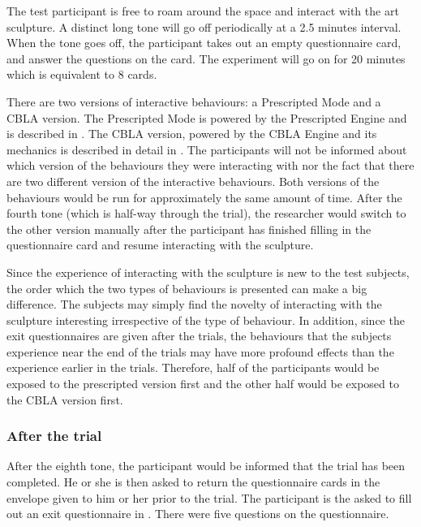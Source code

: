 The test participant is free to roam around the space and interact with the art sculpture. A distinct long tone will go off periodically at a 2.5 minutes interval. When the tone goes off, the participant takes out an empty questionnaire card, and answer the questions on the card. The experiment will go on for 20 minutes which is equivalent to 8 cards.

There are two versions of interactive behaviours: a Prescripted Mode and a CBLA version. The Prescripted Mode is powered by the Prescripted Engine and is described in . The CBLA version, powered by the CBLA Engine and its mechanics is described in detail in . The participants will not be informed about which version of the behaviours they were interacting with nor the fact that there are two different version of the interactive behaviours. Both versions of the behaviours would be run for approximately the same amount of time. After the fourth tone (which is half-way through the trial), the researcher would switch to the other version manually after the participant has finished filling in the questionnaire card and resume interacting with the sculpture. 

Since the experience of interacting with the sculpture is new to the test subjects, the order which the two types of behaviours is presented can make a big difference. The subjects may simply find the novelty of interacting with the sculpture interesting irrespective of the type of behaviour. In addition, since the exit questionnaires are given after the trials, the behaviours that the subjects experience near the end of the trials may have more profound effects than the experience earlier in the trials. Therefore, half of the participants would be exposed to the prescripted version first and the other half would be exposed to the CBLA version first.

\subsubsection{After the trial}

After the eighth tone, the participant would be informed that the trial has been completed. He or she is then asked to return the questionnaire cards in the envelope given to him or her prior to the trial. The participant is the asked to fill out an exit questionnaire in . There were five questions on the questionnaire. 

